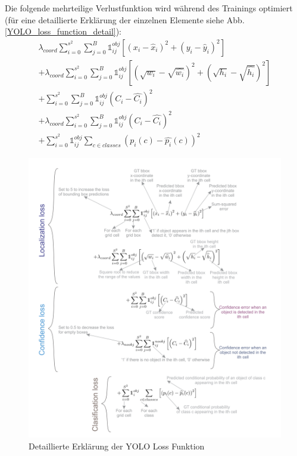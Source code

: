 {{	Die folgende mehrteilige Verlustfunktion wird während des Trainings optimiert (für eine detaillierte Erklärung der einzelnen Elemente siehe Abb. \ref{YOLO_loss_function_detail}):
	\begin{multline}
		\lambda_{coord} \sum_{i=0}^{s^2} \sum_{j=0}^{B} \mathbb{1}_{i j}^{obj}\left[(x_i-\hat{x}_i)^2 + (y_i - \hat{y}_i)^2\right]\\
		+ \lambda_{coord} \sum_{i=0}^{s^2} \sum_{j=0}^{B} \mathbb{1}_{i j}^{obj}\left[\left(\sqrt{w_i} - \sqrt{\hat{w_i}}\right)^2 + \left(\sqrt{h_i}-\sqrt{\hat{h_i}}\right)^2\right]\\
		+ \sum_{i=0}^{s^2} \sum_{j=0}^{B} \mathbb{1}_{i j}^{obj}\left(C_i - \hat{C_i}\right)^2\\
		+ \lambda_{coord} \sum_{i=0}^{s^2} \sum_{j=0}^{B} \mathbb{1}_{i j}^{obj}\left(C_i - \hat{C_i}\right)^2\\
		+ \sum_{i=0}^{s^2} \mathbb{1}_{i j}^{obj} \sum_{c \in classes } \left(p_i(c)-\hat{p_i}(c)\right)^2
	\end{multline} 
	\begin{figure}[h]
		\centering
		\includegraphics*[scale = 0.4, keepaspectratio]{images/YOLO/YOLO_loss_function_detail_expl.png}
		\caption[Detaillierte Erklärung der YOLO Loss Funktion]{Detaillierte Erklärung der YOLO Loss Funktion\citep{Terven2023}}

\end{figure}}}
